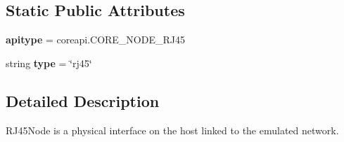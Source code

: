 \subsection*{Static Public Attributes}
\begin{DoxyCompactItemize}
\item 
\hypertarget{classcore_1_1netns_1_1nodes_1_1_r_j45_node_a9e381c0d5eedf7cdec973caa5da81160}{{\bfseries apitype} = coreapi.\+C\+O\+R\+E\+\_\+\+N\+O\+D\+E\+\_\+\+R\+J45}\label{classcore_1_1netns_1_1nodes_1_1_r_j45_node_a9e381c0d5eedf7cdec973caa5da81160}

\item 
\hypertarget{classcore_1_1netns_1_1nodes_1_1_r_j45_node_a1eb47e551b582d30fe5d8bf5047bc576}{string {\bfseries type} = \char`\"{}rj45\char`\"{}}\label{classcore_1_1netns_1_1nodes_1_1_r_j45_node_a1eb47e551b582d30fe5d8bf5047bc576}

\end{DoxyCompactItemize}


\subsection{Detailed Description}
\begin{DoxyVerb}RJ45Node is a physical interface on the host linked to the emulated
    network.
\end{DoxyVerb}
 

